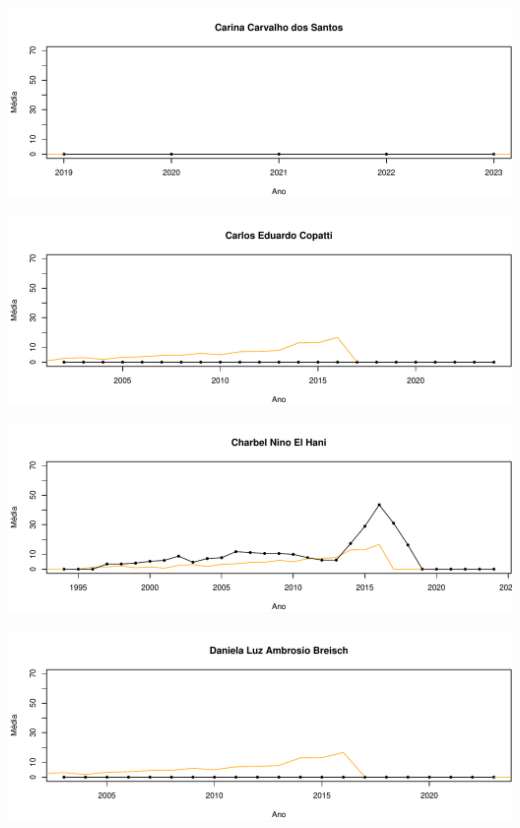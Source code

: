 \documentclass[12pt,brazil]{article}\usepackage[]{graphicx}\usepackage[]{xcolor}
\makeatletter
\def\maxwidth{ %
  \ifdim\Gin@nat@width>\linewidth
    \linewidth
  \else
    \Gin@nat@width
  \fi
}
\makeatother
\begin{document}
\vspace{0.5cm}


{\centering \includegraphics[width=\maxwidth]{figure/mediamovel-11} 

}



\vspace{0.5cm}


{\centering \includegraphics[width=\maxwidth]{figure/mediamovel-12} 

}



\vspace{0.5cm}


{\centering \includegraphics[width=\maxwidth]{figure/mediamovel-13} 

}



\vspace{0.5cm}


{\centering \includegraphics[width=\maxwidth]{figure/mediamovel-14} 

}
\end{document}

